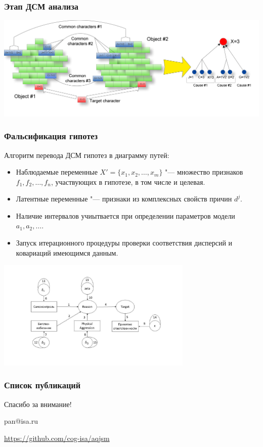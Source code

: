 \documentclass[default]{beamer}
\begin{document}
	\begin{frame}
		\frametitle{Этап ДСМ анализа}
		
		\centering
		\includegraphics[width=\textwidth]{JSMProcess.jpeg}
	\end{frame}
	
	\begin{frame}
		\frametitle{Фальсификация гипотез}
		\scriptsize
		Алгоритм перевода ДСМ гипотез в диаграмму путей:
		\begin{itemize}
			\item Наблюдаемые переменные $X'=\{x_1,x_2,\dots,x_m\}$ "--- множество признаков $f_1, f_2,\dots, f_n$, участвующих в гипотезе, в том числе и целевая.
			\item Латентные переменные  "--- признаки из комплексных свойств причин $d^j$.
			\item Наличие интервалов учиытвается при определении параметров модели $a_1, a_2,\dots$.
			\item Запуск итерационного процедуры проверки соответствия дисперсий и ковариаций имеющимся данным.
		\end{itemize}
		\centering
		\includegraphics[width=0.7\textwidth]{hyp.jpg}
	\end{frame}
	
	\begin{frame}
		\frametitle{Список публикаций}
		
		\nocite{*}
		\printbibliography[resetnumbers=true]
	\end{frame}	
				
	\begin{frame}
		\centering
		\Huge
		Спасибо за внимание!
		\normalsize
		\par\bigskip
		\par\bigskip
		\par\bigskip
		pan@isa.ru
		\par\bigskip
		\url{https://github.com/cog-isa/aqjsm}
	\end{frame}			
\end{document}
